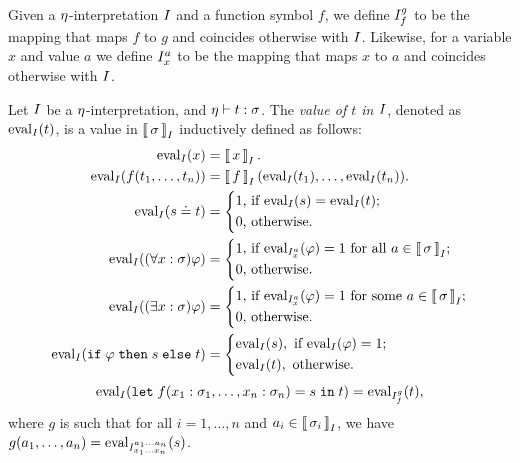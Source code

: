 Given a $\context$-interpretation $\intI$ and a function symbol $f$, we define $\variant{\intI}{f}{g}$ to be the mapping that maps $f$ to $g$ and coincides otherwise with $\intI$.
Likewise, for a variable $x$ and value $a$ we define $\variant{\intI}{x}{a}$ to be the mapping that maps $x$ to $a$ and coincides otherwise with $\intI$.

\begin{definition}\label{def:folb-term-evaluation}
  Let $\intI$ be a $\context$-interpretation, and $\context \vdash t:\sigma$. The \emph{value of $t$ in $\intI$}, denoted as $\eval{t}{\intI}$, is a value in $\interpret{\sigma}{\intI}$ inductively defined as follows:
  \[
    \begin{aligned}
      \eval{x}{\intI} &= \interpret{x}{\intI}.
      \\
      \eval{f(t_1, \ldots, t_n)}{\intI} &= \interpret{f}{\intI}(\eval{t_1}{\intI}, \ldots, \eval{t_n}{\intI}).
      \\
      \eval{s \eql t}{\intI} &=
        \left\{ \begin{aligned}
                  &\text{1, if $\eval{s}{\intI} = \eval{t}{\intI}$;} \\
                  &\text{0, otherwise.}
                \end{aligned}\right.
      \\
      \eval{(\forall x : \sigma)\phi}{\intI} &=
        \left\{ \begin{aligned}
                  &\text{1, if $\eval{\phi}{\replacement{\intI}{x}{a}} = 1$ for all $a \in \interpret{\sigma}{\intI}$;} \\
                  &\text{0, otherwise.}
                \end{aligned}\right.
      \\
      \eval{(\exists x : \sigma)\phi}{\intI} &=
        \left\{ \begin{aligned}
                  &\text{1, if $\eval{\phi}{\replacement{\intI}{x}{a}} = 1$ for some  $a \in \interpret{\sigma}{\intI}$;} \\
                  &\text{0, otherwise.}
                \end{aligned}\right.
      \\
      \eval{\ite{\phi}{s}{t}}{\intI} &=
        \left\{ \begin{aligned}
                  &\eval{s}{\intI},\text{ if $\eval{\phi}{\intI} = 1$;} \\
                  &\eval{t}{\intI},\text{ otherwise.}
                \end{aligned}\right.
    \end{aligned}
  \]
  \[
      \eval{\letin{f(x_1:\sigma_1,\ldots,x_n:\sigma_n)}{s}{t}}{\intI} = \eval{t}{\replacement{\intI}{f}{g}},
  \]
  where $g$ is such that for all $i = 1, \ldots, n$ and $a_i \in \interpret{\sigma_i}{\intI}$, we have $g(a_1, \ldots, a_n) = \eval{s}{\replacement{\intI}{x_1 \ldots x_n}{a_1 \ldots a_n}}$. \QED
\end{definition}

